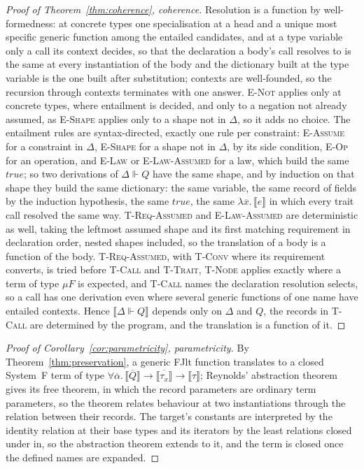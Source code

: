 \begin{proof}[Proof of Theorem~\ref{thm:coherence}, coherence]
Resolution is a function by well-formedness: at concrete types one specialisation at a head and a unique most specific generic function among the entailed candidates, and at a type variable only a call its context decides, so that the declaration a body's call resolves to is the same at every instantiation of the body and the dictionary built at the type variable is the one built after substitution; contexts are well-founded, so the recursion through contexts terminates with one answer.
\textsc{E-Not} applies only at concrete types, where entailment is decided, and only to a negation not already assumed, as \textsc{E-Shape} applies only to a shape not in $\Delta$, so it adds no choice.
The entailment rules are syntax-directed, exactly one rule per constraint: \textsc{E-Assume} for a constraint in $\Delta$, \textsc{E-Shape} for a shape not in $\Delta$, by its side condition, \textsc{E-Op} for an operation, and \textsc{E-Law} or \textsc{E-Law-Assumed} for a law, which build the same $\mathit{true}$; so two derivations of $\Delta \Vdash Q$ have the same shape, and by induction on that shape they build the same dictionary: the same variable, the same record of fields by the induction hypothesis, the same $\mathit{true}$, the same $\lambda\overline{x}.\,\llbracket e \rrbracket$ in which every trait call resolved the same way.
\textsc{T-Req-Assumed} and \textsc{E-Law-Assumed} are deterministic as well, taking the leftmost assumed shape and its first matching requirement in declaration order, nested shapes included, so the translation of a body is a function of the body.
\textsc{T-Req-Assumed}, with \textsc{T-Conv} where its requirement converts, is tried before \textsc{T-Call} and \textsc{T-Trait}, \textsc{T-Node} applies exactly where a term of type $\mu F$ is expected, and \textsc{T-Call} names the declaration resolution selects, so a call has one derivation even where several generic functions of one name have entailed contexts.
Hence $\llbracket \Delta \Vdash Q \rrbracket$ depends only on $\Delta$ and $Q$, the records in \textsc{T-Call} are determined by the program, and the translation is a function of it.
\end{proof}

\begin{proof}[Proof of Corollary~\ref{cor:parametricity}, parametricity]
By Theorem~\ref{thm:preservation}, a generic FJlt function translates to a closed System~F term of type $\forall\overline{\alpha}.\,\overline{\llbracket Q \rrbracket} \to \overline{\llbracket \tau_x \rrbracket} \to \llbracket \tau \rrbracket$; Reynolds' abstraction theorem~\cite{reynolds1983types,wadler1989theorems} gives its free theorem, in which the record parameters are ordinary term parameters, so the theorem relates behaviour at two instantiations through the relation between their records.
The target's constants are interpreted by the identity relation at their base types and its iterators by the least relations closed under $\mathrm{in}$, so the abstraction theorem extends to it, and the term is closed once the defined names are expanded.
\end{proof}

